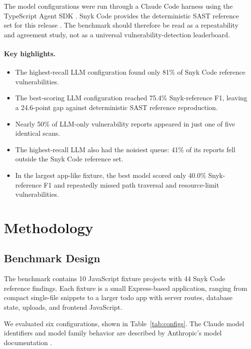 \documentclass[11pt]{article}
\begin{document}
The model configurations were run through a Claude Code harness using the TypeScript Agent SDK \cite{anthropic-claude-code,anthropic-agent-sdk}. Snyk Code provides the deterministic SAST reference set for this release \cite{snyk-code-docs}. The benchmark should therefore be read as a repeatability and agreement study, not as a universal vulnerability-detection leaderboard.

\paragraph{Key highlights.}
\begin{itemize}
  \item The highest-recall LLM configuration found only 81\% of Snyk Code reference vulnerabilities.
  \item The best-scoring LLM configuration reached 75.4\% Snyk-reference F1, leaving a 24.6-point gap against deterministic SAST reference reproduction.
  \item Nearly 50\% of LLM-only vulnerability reports appeared in just one of five identical scans.
  \item The highest-recall LLM also had the noisiest queue: 41\% of its reports fell outside the Snyk Code reference set.
  \item In the largest app-like fixture, the best model scored only 40.0\% Snyk-reference F1 and repeatedly missed path traversal and resource-limit vulnerabilities.
\end{itemize}

\section{Methodology}

\subsection{Benchmark Design}

The benchmark contains 10 JavaScript fixture projects with 44 Snyk Code reference findings. Each fixture is a small Express-based application, ranging from compact single-file snippets to a larger todo app with server routes, database state, uploads, and frontend JavaScript.

We evaluated six configurations, shown in Table~\ref{tab:configs}. The Claude model identifiers and model family behavior are described by Anthropic's model documentation \cite{anthropic-models-overview}.
\end{document}
